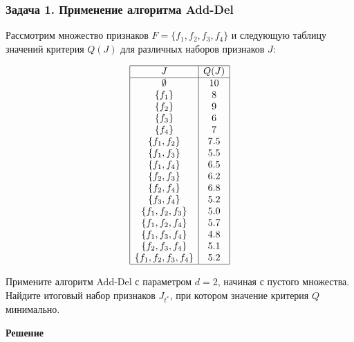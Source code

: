 \subsubsection*{Задача 1. Применение алгоритма Add-Del}

Рассмотрим множество признаков \( F = \{f_1, f_2, f_3, f_4\} \) и следующую таблицу значений критерия \( Q(J) \) для различных наборов признаков \( J \):

\[
    \begin{array}{|c|c|}
        \hline
        J                      & Q(J) \\
        \hline
        \emptyset              & 10   \\
        \{f_1\}                & 8    \\
        \{f_2\}                & 9    \\
        \{f_3\}                & 6    \\
        \{f_4\}                & 7    \\
        \{f_1, f_2\}           & 7.5  \\
        \{f_1, f_3\}           & 5.5  \\
        \{f_1, f_4\}           & 6.5  \\
        \{f_2, f_3\}           & 6.2  \\
        \{f_2, f_4\}           & 6.8  \\
        \{f_3, f_4\}           & 5.2  \\
        \{f_1, f_2, f_3\}      & 5.0  \\
        \{f_1, f_2, f_4\}      & 5.7  \\
        \{f_1, f_3, f_4\}      & 4.8  \\
        \{f_2, f_3, f_4\}      & 5.1  \\
        \{f_1, f_2, f_3, f_4\} & 5.2  \\
        \hline
    \end{array}
\]

Примените алгоритм Add-Del с параметром \( d = 2 \), начиная с пустого множества. Найдите итоговый набор признаков \( J_{t^*} \), при котором значение критерия \( Q \) минимально.

\bigskip

\textbf{Решение}



